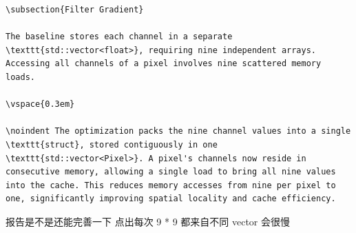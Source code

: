 \documentclass[11pt, a4paper]{article}
\begin{document}
\vspace{1.5em}

\begin{userbox}
\begin{verbatim}
\subsection{Filter Gradient}

The baseline stores each channel in a separate \texttt{std::vector<float>}, requiring nine independent arrays. Accessing all channels of a pixel involves nine scattered memory loads.

\vspace{0.3em}

\noindent The optimization packs the nine channel values into a single \texttt{struct}, stored contiguously in one \texttt{std::vector<Pixel>}. A pixel's channels now reside in consecutive memory, allowing a single load to bring all nine values into the cache. This reduces memory accesses from nine per pixel to one, significantly improving spatial locality and cache efficiency.
\end{verbatim}

报告是不是还能完善一下 点出每次 9 * 9 都来自不同 vector 会很慢
\end{userbox}
\end{document}
